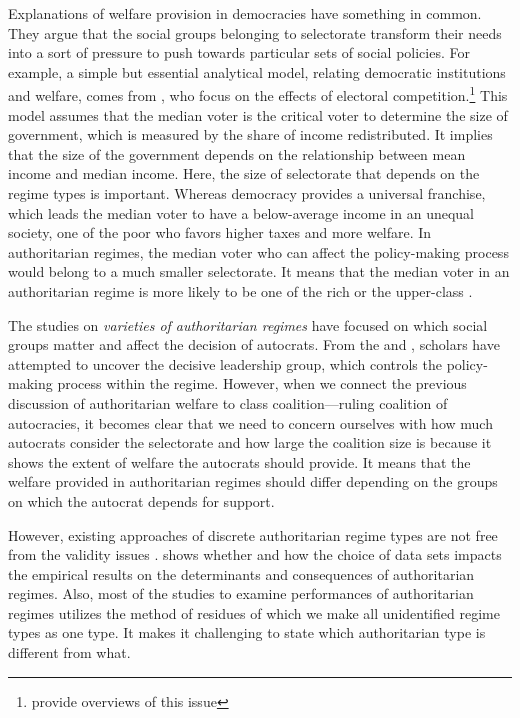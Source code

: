 \documentclass[12pt, letterpage, notitlepage]{article}
\begin{document}
Explanations of welfare provision in democracies have something in common. They argue that the social groups belonging to selectorate transform their needs into a sort of pressure to push towards particular sets of social policies. For example, a simple but essential analytical model, relating democratic institutions and welfare, comes from \citet{Meltzer1981}, who focus on the effects of electoral competition.\footnote{\citet{Boix2003} provide overviews of this issue} This model assumes that the median voter is the critical voter to determine the size of government, which is measured by the share of income redistributed. It implies that the size of the government depends on the relationship between mean income and median income. Here, the size of selectorate that depends on the regime types is important. Whereas democracy provides a universal franchise, which leads the median voter to have a below-average income in an unequal society, one of the poor who favors higher taxes and more welfare. In authoritarian regimes, the median voter who can affect the policy-making process would belong to a much smaller selectorate. It means that the median voter in an authoritarian regime is more likely to be one of the rich or the upper-class \citep[2]{Yi2014}.\par

The studies on \textit{varieties of authoritarian regimes} have focused on which social groups matter and affect the decision of autocrats. From the \citet{Geddes1999} and \citet{Geddes2014}, scholars have attempted to uncover the decisive leadership group, which controls the policy-making process within the regime. However, when we connect the previous discussion of authoritarian welfare to class coalition---ruling coalition of autocracies, it becomes clear that we need to concern ourselves with how much autocrats consider the selectorate and how large the coalition size is because it shows the extent of welfare the autocrats should provide. It means that the welfare provided in authoritarian regimes should differ depending on the groups on which the autocrat depends for support.\par

However, existing approaches of discrete authoritarian regime types are not free from the validity issues \citep{Wilson2014}. \citet[52]{Roller2013} shows whether and how the choice of data sets impacts the empirical results on the determinants and consequences of authoritarian regimes. Also, most of the studies to examine performances of authoritarian regimes utilizes the method of residues of which we make all unidentified regime types as one type. It makes it challenging to state which authoritarian type is different from what.
\end{document}
